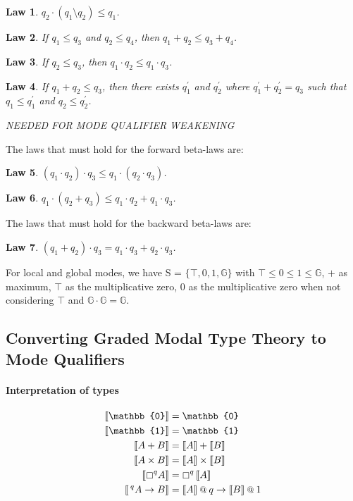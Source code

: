 \documentclass[acmsmall,screen,nonacm]{acmart}
\makeatletter
\newcommand{\at}{\mathbin{\mbox{\small\ensuremath{@}}}}
\newcommand{\unit}{\mathbb{1}}
\newcommand{\zero}{\mathbb{0}}
\newcommand{\sem}[1]{\llbracket #1 \rrbracket}
\newtheorem{law}{Law}
\makeatother
\begin{document}
\begin{law}
\label{law:mul-inverse-div}
  $q_2 \cdot (q_1 \setminus q_2) \le q_1$.
\end{law}

\begin{law}
\label{law:add-mono}
  If $q_1 \le q_3$ and $q_2 \le q_4$, then $q_1 + q_2 \le q_3 + q_4$.
\end{law}

\begin{law}
\label{law:mul-mono-left}
  If $q_2 \le q_3$, then $q_1 \cdot q_2 \le q_1 \cdot q_3$.
\end{law}

\begin{law}
\label{law:riesz-decomposition-dual}
  If $q_1 + q_2 \le q_3$, then there exists $q_1^\prime$ and $q_2^\prime$ where $q_1^\prime + q_2^\prime = q_3$ such that $q_1 \le q_1^\prime$ and $q_2 \le q_2^\prime$.
  
  NEEDED FOR MODE QUALIFIER WEAKENING
\end{law}

The laws that must hold for the forward beta-laws are:

\begin{law}
\label{law:mul-assoc-2}
  $(q_1 \cdot q_2) \cdot q_3 \le q_1 \cdot (q_2 \cdot q_3)$.
\end{law}

\begin{law}
\label{law:mul-distr-add-left-2}
  $q_1 \cdot (q_2 + q_3) \le q_1 \cdot q_2 + q_1 \cdot q_3$.
\end{law}

The laws that must hold for the backward beta-laws are:

\begin{law}
\label{law:mul-distr-add-right-2}
  $(q_1 + q_2) \cdot q_3 = q_1 \cdot q_3 + q_2 \cdot q_3$.
\end{law}

For local and global modes, we have S = $\{\top, 0, 1, \mathbb{G}\}$ with
$\top \le 0 \le 1 \le \mathbb{G}$, $+$ as maximum, $\top$ as the multiplicative zero, 0 as the multiplicative zero when not considering $\top$ and $\mathbb{G} \cdot \mathbb{G} = \mathbb{G}$.

\subsection{Converting Graded Modal Type Theory to Mode Qualifiers}

\paragraph{Interpretation of types}
%
\begin{align*}
  \sem{\zero} &= \zero \\
  \sem{\unit} &= \unit \\
  \sem{A + B} &= \sem{A} + \sem{B} \\
  \sem{A \times B} &= \sem{A} \times \sem{B} \\
  \sem{\boxempty^{q} A} &= \boxempty^{q}\, \sem{A} \\
  \sem{\,^q A \rightarrow B} &= \sem{A} \at q \rightarrow \sem{B} \at 1
\end{align*}
\end{document}
